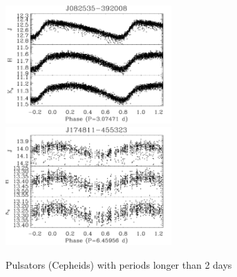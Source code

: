\documentclass[]{emulateapj}
\begin{document}
\begin{figure}[]
\centering
\includegraphics[width=2.5in]{new_plots/rr_9}
\includegraphics[width=2.5in]{new_plots/rr_10}
\caption{Pulsators (Cepheids)  with periods longer than 2 days}
\label{rrlong}
\end{figure}


 

\end{document}
